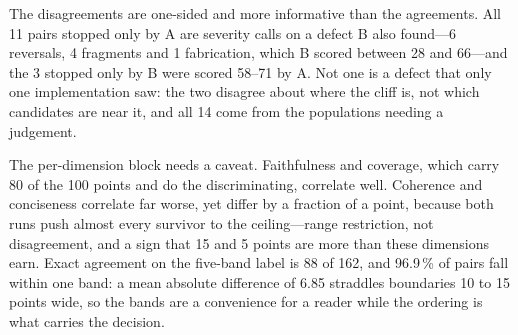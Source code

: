 \documentclass[conference]{IEEEtran}
\begin{document}
The disagreements are one-sided and more informative than the agreements.
All 11 pairs stopped only by A are severity calls on a defect B also
found---6 reversals, 4 fragments and 1 fabrication, which B scored between
28 and 66---and the 3 stopped only by B were scored 58--71 by A. Not one is
a defect that only one implementation saw: the two disagree about where the
cliff is, not which candidates are near it, and all 14 come from the
populations needing a judgement.

The per-dimension block needs a caveat. Faithfulness and coverage, which
carry 80 of the 100 points and do the discriminating, correlate well.
Coherence and conciseness correlate far worse, yet differ by a fraction of
a point, because both runs push almost every survivor to the
ceiling---range restriction, not disagreement, and a sign that 15 and 5
points are more than these dimensions earn. Exact agreement
on the five-band label is 88 of 162, and 96.9\,\% of pairs fall within one
band: a mean absolute difference of 6.85 straddles boundaries 10 to 15 points
wide, so the bands are a convenience for a reader while the ordering is what
carries the decision.
\end{document}
